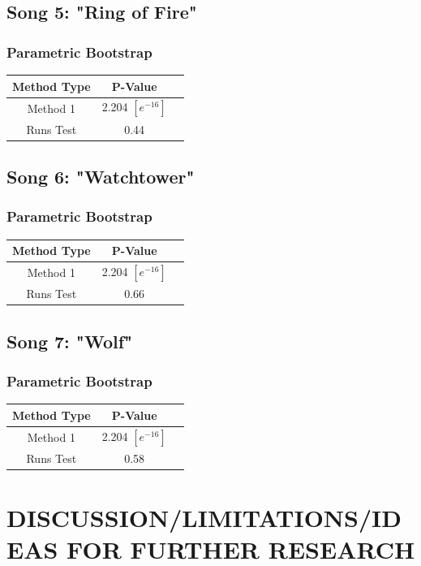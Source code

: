 \documentclass[12pt, letterpaper]{article}
\begin{document}
\subsection{Song 5: "Ring of Fire"}
\subsubsection{Parametric Bootstrap}

\begin{tabular}{|c|c|c|}
\hline
\textbf{Method Type} & P-Value  \\
\hline
Method 1 & 2.204 $[e^{-16}]$ \\
\hline
Runs Test & 0.44 \\ 
\hline
\end{tabular}

\subsection{Song 6: "Watchtower"}
\subsubsection{Parametric Bootstrap}

\begin{tabular}{|c|c|c|}
\hline
\textbf{Method Type} & P-Value  \\
\hline
Method 1 & 2.204 $[e^{-16}]$ \\
\hline
Runs Test & 0.66 \\ 
\hline
\end{tabular}
\subsection{Song 7: "Wolf"}
\subsubsection{Parametric Bootstrap}

\begin{tabular}{|c|c|c|}
\hline
\textbf{Method Type} & P-Value  \\
\hline
Method 1 & 2.204 $[e^{-16}]$ \\
\hline
Runs Test & 0.58 \\ 
\hline
\end{tabular}


\section{DISCUSSION/LIMITATIONS/IDEAS FOR FURTHER RESEARCH}
\end{document}
